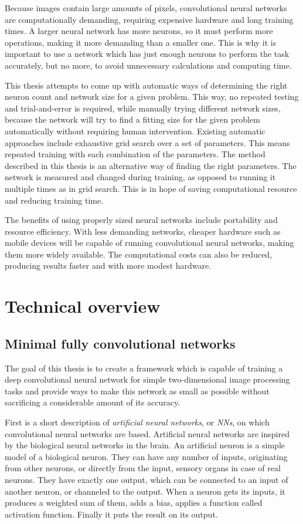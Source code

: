 \documentclass[12pt]{report}
\begin{document}
Because images contain large amounts of pixels, convolutional neural networks are computationally demanding, requiring expensive hardware and long training times. A larger neural network has more neurons, so it must perform more operations, making it more demanding than a smaller one. This is why it is important to use a network which has just enough neurons to perform the task accurately, but no more, to avoid unnecessary calculations and computing time.

This thesis attempts to come up with automatic ways of determining the right neuron count and network size for a given problem. This way, no repeated testing and trial-and-error is required, while manually trying different network sizes, because the network will try to find a fitting size for the given problem automatically without requiring human intervention. Existing automatic approaches include exhaustive grid search over a set of parameters. This means repeated training with each combination of the parameters. The method described in this thesis is an alternative way of finding the right parameters. The network is measured and changed during training, as opposed to running it multiple times as in grid search. This is in hope of saving computational resource and reducing training time.

The benefits of using properly sized neural networks include portability and resource efficiency. With less demanding networks, cheaper hardware such as mobile devices will be capable of running convolutional neural networks, making them more widely available. The computational costs can also be reduced, producing results faster and with more modest hardware.
\chapter{Technical overview}
\section{Minimal fully convolutional networks}
The goal of this thesis is to create a framework which is capable of training a deep convolutional neural network for simple two-dimensional image processing tasks and provide ways to make this network as small as possible without sacrificing a considerable amount of its accuracy.

First is a short description of\textit{ artificial neural networks}, or \textit{NNs}, on which convolutional neural networks are based. Artificial neural networks are inspired by the biological neural networks in the brain. An artificial neuron is a simple model of a biological neuron. They can have any number of inputs, originating from other neurons, or directly from the input, sensory organs in case of real neurons. They have exactly one output, which can be connected to an input of another neuron, or channeled to the output. When a neuron gets its inputs, it produces a weighted sum of them, adds a bias, applies a function called activation function. Finally it puts the result on its output.
\end{document}
